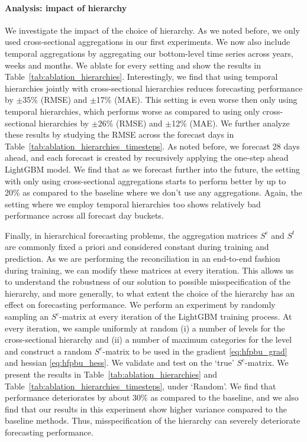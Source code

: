 \documentclass[preprint, 3p, times, twocolumn]{elsarticle}
\begin{document}
  \paragraph{Analysis: impact of hierarchy} We investigate the impact of the choice of hierarchy. As we noted before, we only used cross-sectional aggregations in our first experiments. We now also include temporal aggregations by aggregating our bottom-level time series across years, weeks and months. We ablate for every setting and show the results in Table~\ref{tab:ablation_hierarchies}. Interestingly, we find that using temporal hierarchies jointly with cross-sectional hierarchies reduces forecasting performance by $\pm$35\% (RMSE) and $\pm$17\% (MAE). This setting is even worse then only using temporal hierarchies, which performs worse as compared to using only cross-sectional hierarchies by $\pm$26\% (RMSE) and $\pm$12\% (MAE). We further analyze these results by studying the RMSE across the forecast days in Table~\ref{tab:ablation_hierarchies_timesteps}. As noted before, we forecast 28 days ahead, and each forecast is created by recursively applying the one-step ahead LightGBM model. We find that as we forecast further into the future, the setting with only using cross-sectional aggregations starts to perform better by up to 20\% as compared to the baseline where we don't use any aggregations. Again, the setting where we employ temporal hierarchies too shows relatively bad performance across all forecast day buckets.  
  
  Finally, in hierarchical forecasting problems, the aggregation matrices \(S^c\) and \(S^t\) are commonly fixed a priori and considered constant during training and prediction. As we are performing the reconciliation in an end-to-end fashion during training, we can modify these matrices at every iteration. This allows us to understand the robustness of our solution to possible misspecification of the hierarchy, and more generally, to what extent the choice of the hierarchy has an effect on forecasting performance. We perform an experiment by randomly sampling an \(S^c\)-matrix at every iteration of the LightGBM training process. At every iteration, we sample uniformly at random (i) a number of levels for the cross-sectional hierarchy and (ii) a number of maximum categories for the level and construct a random \(S^c\)-matrix to be used in the gradient \eqref{eq:hfpbu_grad} and hessian \eqref{eq:hfpbu_hess}. We validate and test on the `true' \(S^c\)-matrix. We present the results in Table~\ref{tab:ablation_hierarchies} and Table~\ref{tab:ablation_hierarchies_timesteps}, under `Random'. We find that performance deteriorates by about 30\% as compared to the baseline, and we also find that our results in this experiment show higher variance compared to the baseline methods. Thus, misspecification of the hierarchy can severely deteriorate forecasting performance.
  
\end{document}
